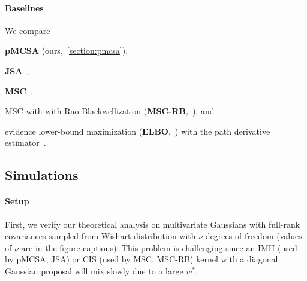 \paragraph{Baselines}
We compare
\begin{enumerate*}[label=\textbf{(\roman*)}]
  \item \textbf{pMCSA} (ours,~\cref{section:pmcsa}),
  \item \textbf{JSA}~\citep{pmlr-v124-ou20a},
  \item \textbf{MSC}~\citep{NEURIPS2020_b2070693},
  \item MSC with with Rao-Blackwellization (\textbf{MSC-RB},~\citealt{NEURIPS2020_b2070693}), and
  \item evidence lower-bound maximization (\textbf{ELBO},~\citealt{pmlr-v33-ranganath14, JMLR:v18:16-107}) with the path derivative estimator~\citep{NIPS2017_e91068ff}.
\end{enumerate*}
\pagebreak

\vspace{-1.5ex}
\subsection{Simulations}\label{section:simulation}
\vspace{-1.5ex}
\paragraph{Setup}
First, we verify our theoretical analysis on multivariate Gaussians with full-rank covariances sampled from Wishart distribution with \(\nu\) degrees of freedom (values of \(\nu\) are in the figure captions).
This problem is challenging since an IMH (used by pMCSA, JSA) or CIS (used by MSC, MSC-RB) kernel with a diagonal Gaussian proposal will mix slowly due to a large \(w^*\).


\vspace{-1.5ex}
